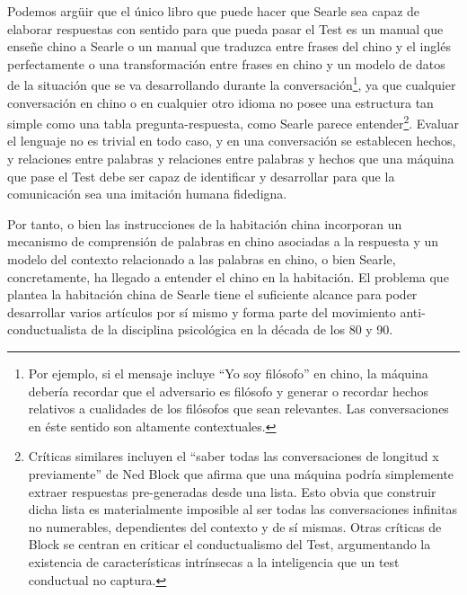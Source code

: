 \documentclass[12pt]{memoir}
\begin{document}
Podemos argüir que el único libro que puede hacer que Searle sea capaz de elaborar respuestas con sentido para que pueda pasar el Test es un manual que enseñe chino a Searle o un manual que traduzca entre frases del chino y el inglés perfectamente o una transformación entre frases en chino y un modelo de datos de la situación que se va desarrollando durante la conversación\footnote{Por ejemplo, si el mensaje incluye ``Yo soy filósofo'' en chino, la máquina debería recordar que el adversario es filósofo y generar o recordar hechos relativos a cualidades de los filósofos que sean relevantes. Las conversaciones en éste sentido son altamente contextuales.}, ya que cualquier conversación en chino o en cualquier otro idioma no posee una estructura tan simple como una tabla pregunta-respuesta, como Searle parece entender\footnote{Críticas similares incluyen el ``saber todas las conversaciones de longitud x previamente'' de Ned Block \parencite[apartado 4.1]{afterTuring} que afirma que una máquina podría simplemente extraer respuestas pre-generadas desde una lista. Esto obvia que construir dicha lista es materialmente imposible al ser todas las conversaciones infinitas no numerables, dependientes del contexto y de sí mismas. Otras críticas de Block se centran en criticar el conductualismo del Test, argumentando la existencia de características intrínsecas a la inteligencia que un test conductual no captura.}. Evaluar el lenguaje no es trivial en todo caso, y en una conversación se establecen hechos, y relaciones entre palabras y relaciones entre palabras y hechos que una máquina que pase el Test debe ser capaz de identificar y desarrollar para que la comunicación sea una imitación humana fidedigna. 

Por tanto, o bien las instrucciones de la habitación china incorporan un mecanismo de comprensión de palabras en chino asociadas a la respuesta y un modelo del contexto relacionado a las palabras en chino, o bien Searle, concretamente, ha llegado a entender el chino en la habitación. El problema que plantea la habitación china de Searle tiene el suficiente alcance para poder desarrollar varios artículos por sí mismo y forma parte del movimiento anti-conductualista de la disciplina psicológica en la década de los 80 y 90.
\end{document}
